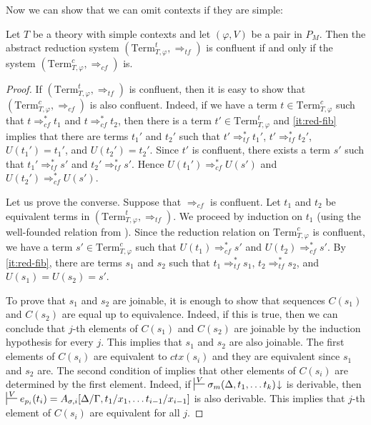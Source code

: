 \documentclass[reqno]{amsart}
\theoremstyle{definition}
\theoremstyle{remark}
\newcommand{\Term}{\mathrm{Term}}
\newcommand{\ctx}{\mathit{ctx}}
\numberwithin{figure}{section}
\begin{document}
Now we can show that we can omit contexts if they are simple:
\begin{prop}
Let $T$ be a theory with simple contexts and let $(\varphi,V)$ be a pair in $P_M$.
Then the abstract reduction system $(\Term_{T,\varphi}^t, \Rightarrow_{tf})$ is confluent if and only if the system $(\Term_{T,\varphi}^c, \Rightarrow_{cf})$ is.
\end{prop}
\begin{proof}
If $(\Term_{T,\varphi}^t,\Rightarrow_{tf})$ is confluent, then it is easy to show that $(\Term_{T,\varphi}^c,\Rightarrow_{cf})$ is also confluent.
Indeed, if we have a term $t \in \Term_{T,\varphi}^c$ such that $t \Rightarrow_{cf}^* t_1$ and $t \Rightarrow_{cf}^* t_2$,
then there is a term $t' \in \Term_{T,\varphi}^t$ and \eqref{it:red-fib} implies that there are terms $t_1'$ and $t_2'$ such that
$t' \Rightarrow_{tf}^* t_1'$, $t' \Rightarrow_{tf}^* t_2'$, $U(t_1') = t_1'$, and $U(t_2') = t_2'$.
Since $t'$ is confluent, there exists a term $s'$ such that $t_1' \Rightarrow_{tf}^* s'$ and $t_2' \Rightarrow_{tf}^* s'$.
Hence $U(t_1') \Rightarrow_{cf}^* U(s')$ and $U(t_2') \Rightarrow_{cf}^* U(s')$.

Let us prove the converse.
Suppose that $\Rightarrow_{cf}$ is confluent.
Let $t_1$ and $t_2$ be equivalent terms in $(\Term_{T,\varphi}^t,\Rightarrow_{tf})$.
We proceed by induction on $t_1$ (using the well-founded relation from ).
Since the reduction relation on $\Term_{T,\varphi}^c$ is confluent, we have a term $s' \in \Term_{T,\varphi}^c$ such that $U(t_1) \Rightarrow_{cf}^* s'$ and $U(t_2) \Rightarrow_{cf}^* s'$.
By \eqref{it:red-fib}, there are terms $s_1$ and $s_2$ such that $t_1 \Rightarrow_{tf}^* s_1$, $t_2 \Rightarrow_{tf}^* s_2$, and $U(s_1) = U(s_2) = s'$.

To prove that $s_1$ and $s_2$ are joinable, it is enough to show that sequences $C(s_1)$ and $C(s_2)$ are equal up to equivalence.
Indeed, if this is true, then we can conclude that $j$-th elements of $C(s_1)$ and $C(s_2)$ are joinable by the induction hypothesis for every $j$.
This implies that $s_1$ and $s_2$ are also joinable.
The first elements of $C(s_i)$ are equivalent to $\ctx(s_i)$ and they are equivalent since $s_1$ and $s_2$ are.
The second condition of  implies that other elements of $C(s_i)$ are determined by the first element.
Indeed, if $\sststile{}{V} \sigma_m(\Delta, t_1, \ldots t_k)\!\downarrow$ is derivable, then $\sststile{}{V} e_{p_i}(t_i) = A_{\sigma,i}[\Delta/\Gamma, t_1/x_1, \ldots t_{i-1}/x_{i-1}]$ is also derivable.
This implies that $j$-th element of $C(s_i)$ are equivalent for all $j$.
\end{proof}
\end{document}
